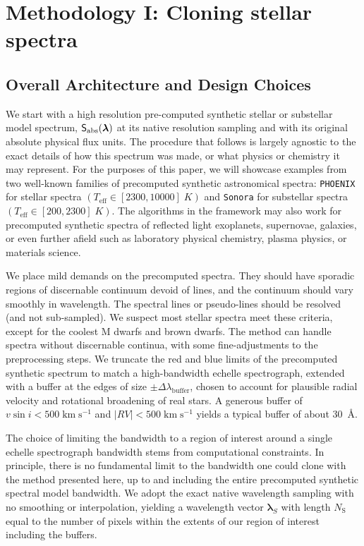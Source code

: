 \documentclass[twocolumn]{aastex631}
\def\kmps{\mathrm{km}\;\mathrm{s}^{-1}}
\begin{document}
\section{Methodology I: Cloning stellar spectra}\label{methodology}

\subsection{Overall Architecture and Design Choices}

We start with a high resolution pre-computed synthetic stellar or substellar model spectrum, $\mathsf{S}_{\rm abs}(\bm{\lambda})$ at its native resolution sampling and with its original absolute physical flux units. The procedure that follows is largely agnostic to the exact details of how this spectrum was made, or what physics or chemistry it may represent. For the purposes of this paper, we will showcase examples from two well-known families of precomputed synthetic astronomical spectra: \texttt{PHOENIX} \citep{husser13} for stellar spectra $(T_{\mathrm{eff}}\in [2300, 10000]\;K)$ and \texttt{Sonora} \citep{2021ApJ...920...85M} for substellar spectra $(T_{\mathrm{eff}}\in [200, 2300]\;K)$. The algorithms in the framework may also work for precomputed synthetic spectra of reflected light exoplanets, supernovae, galaxies, or even further afield such as laboratory physical chemistry, plasma physics, or materials science.

We place mild demands on the precomputed spectra. They should have sporadic regions of discernable continuum devoid of lines, and the continuum should vary smoothly in wavelength. The spectral lines or pseudo-lines should be resolved (and not sub-sampled). We suspect most stellar spectra meet these criteria, except for the coolest M dwarfs and brown dwarfs. The method can handle spectra without discernable continua, with some fine-adjustments to the preprocessing steps. We truncate the red and blue limits of the precomputed synthetic spectrum to match a high-bandwidth echelle spectrograph, extended with a buffer at the edges of size $\pm \Delta \lambda_{\mathrm{buffer}}$, chosen to account for plausible radial velocity and rotational broadening of real stars. A generous buffer of $v \sin{i} < 500 \;\kmps$ and $|RV|<500 \;\kmps$ yields a typical buffer of about 30~\AA.

The choice of limiting the bandwidth to a region of interest around a single echelle spectrograph bandwidth stems from computational constraints. In principle, there is no fundamental limit to the bandwidth one could clone with the method presented here, up to and including the entire precomputed synthetic spectral model bandwidth. We adopt the exact native wavelength sampling with no smoothing or interpolation, yielding a wavelength vector $\bm{\lambda}_S$ with length $N_\mathrm{S}$ equal to the number of pixels within the extents of our region of interest including the buffers.
\end{document}
